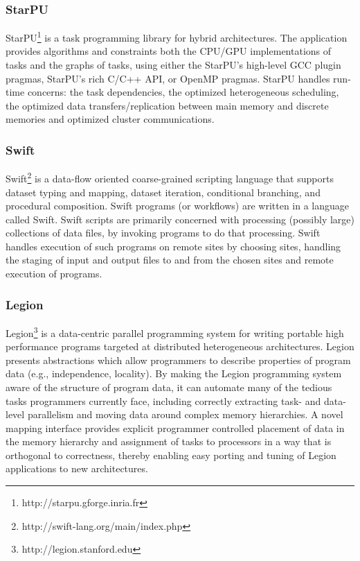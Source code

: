 \subsubsection{StarPU}

StarPU\footnote{http://starpu.gforge.inria.fr} \cite{augonnet2011starpu} is a task programming library for hybrid architectures. The application provides algorithms and constraints both the CPU/GPU implementations of tasks and the graphs of tasks, using either the StarPU's high-level GCC plugin pragmas, StarPU's rich C/C++ API, or OpenMP pragmas. StarPU handles run-time concerns: the task dependencies, the optimized heterogeneous scheduling, the optimized data transfers/replication between main memory and discrete memories and optimized cluster communications.

\subsubsection{Swift}

Swift\footnote{http://swift-lang.org/main/index.php} \cite{wilde2011swift} is a data-flow oriented coarse-grained scripting language that supports dataset typing and mapping, dataset iteration, conditional branching, and procedural composition. Swift programs (or workflows) are written in a language called Swift. Swift scripts are primarily concerned with processing (possibly large) collections of data files, by invoking programs to do that processing. Swift handles execution of such programs on remote sites by choosing sites, handling the staging of input and output files to and from the chosen sites and remote execution of programs.

\subsubsection{Legion}

Legion\footnote{http://legion.stanford.edu} \cite{grimshaw1994synopsis} is a data-centric parallel programming system for writing portable high performance programs targeted at distributed heterogeneous architectures. Legion presents abstractions which allow programmers to describe properties of program data (e.g., independence, locality). By making the Legion programming system aware of the structure of program data, it can automate many of the tedious tasks programmers currently face, including correctly extracting task- and data-level parallelism and moving data around complex memory hierarchies. A novel mapping interface provides explicit programmer controlled placement of data in the memory hierarchy and assignment of tasks to processors in a way that is orthogonal to correctness, thereby enabling easy porting and tuning of Legion applications to new architectures.


